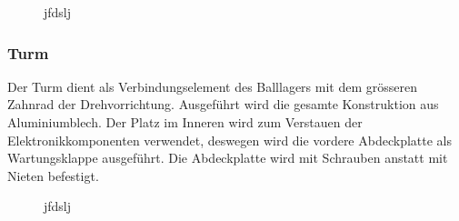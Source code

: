 \begin{figure}[h!]          
    \centering             
    \caption{jfdslj}
    \label{fig:hhjfdhfd}        
\end{figure}

\subsubsection{Turm}
Der Turm dient als Verbindungselement des Balllagers mit dem grösseren Zahnrad 
der Drehvorrichtung. Ausgeführt wird die gesamte Konstruktion aus 
Aluminiumblech. Der Platz im Inneren wird zum Verstauen der 
Elektronikkomponenten verwendet, deswegen wird die vordere Abdeckplatte als 
Wartungsklappe ausgeführt. Die Abdeckplatte wird mit Schrauben anstatt mit 
Nieten befestigt.

\begin{figure}[h!]          
    \centering             
    \caption{jfdslj}
    \label{fig:hhjfdhfd}        
\end{figure}

\clearpage
